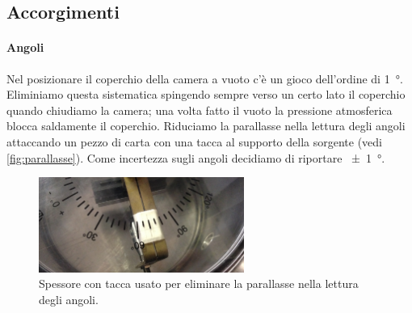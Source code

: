\subsection{Accorgimenti}

\paragraph{Angoli}
\label{spiegazione}

Nel posizionare il coperchio della camera a vuoto c'è un gioco dell'ordine di \SI{1}{\degree}.
Eliminiamo questa sistematica spingendo sempre verso un certo lato il coperchio quando chiudiamo la camera;
una volta fatto il vuoto la pressione atmosferica blocca saldamente il coperchio.
Riduciamo la parallasse nella lettura degli angoli
attaccando un pezzo di carta con una tacca al supporto della sorgente (vedi \autoref{fig:parallasse}).
Come incertezza sugli angoli decidiamo di riportare \SI{\pm1}{\degree}.

\begin{figure}
	\centering
	\includegraphics[width=0.6\textwidth]{immagini/parallasse}
	\caption{\label{fig:parallasse}
	Spessore con tacca usato per eliminare la parallasse nella lettura degli angoli.}
\end{figure}


